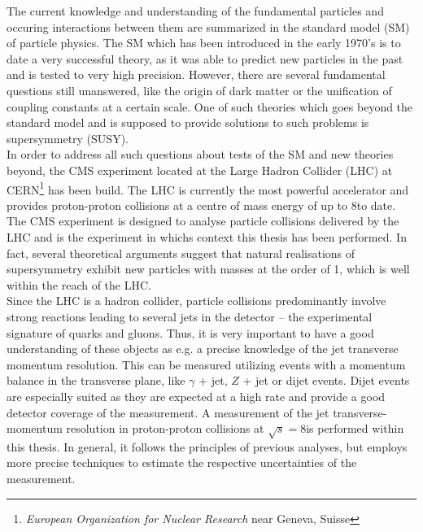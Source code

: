 The current knowledge and understanding of the fundamental particles and occuring interactions between them are summarized in the standard model (SM) of particle physics. The SM which has been introduced in the early 1970's is to date a very successful theory, as it was able to predict new particles in the past and is tested to very high precision. However, there are several fundamental questions still unanswered, like the origin of dark matter or the unification of coupling constants at a certain scale. One of such theories which goes beyond the standard model and is supposed to provide solutions to such problems is supersymmetry (SUSY).  \\
In order to address all such questions about tests of the SM and new theories beyond, the CMS experiment located at the Large Hadron Collider (LHC) at CERN\footnote{\textit{European Organization for Nuclear Research} near Geneva, Suisse} has been build. The LHC is currently the most powerful accelerator and provides proton-proton collisions at a centre of mass energy of up to 8\tev to date. The CMS experiment is designed to analyse particle collisions delivered by the LHC and is the experiment in whichs context this thesis has been performed. In fact, several theoretical arguments suggest that natural realisations of supersymmetry exhibit new particles with masses at the order of 1\tev, which is well within the reach of the LHC. \\
Since the LHC is a hadron collider, particle collisions predominantly involve strong reactions leading to several jets in the detector -- the experimental signature of quarks and gluons. Thus, it is very important to have a good understanding of these objects as e.g. a precise knowledge of the jet transverse momentum resolution. This can be measured utilizing events with a momentum balance in the transverse plane, like $\gamma$ + jet, $Z$ + jet or dijet events. Dijet events are especially suited as they are expected at a high rate and provide a good detector coverage of the measurement. A measurement of the jet transverse-momentum resolution in proton-proton collisions at $\sqrt{s} = 8$\tev is performed within this thesis. In general, it follows the principles of previous analyses, but employs more precise techniques to estimate the respective uncertainties of the measurement. \\
